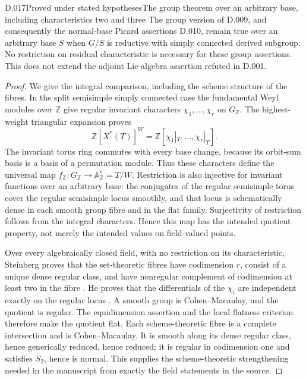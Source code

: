 \begin{saresult}{D.017}{Proved under stated hypotheses}{The group theorem over an arbitrary base, including characteristics two and three}
The group version of D.009, and consequently the normal-base
Picard assertions D.010, remain true over an arbitrary base $S$
when $G/S$ is reductive with simply connected derived subgroup.
No restriction on residual characteristic is necessary for these
group assertions.  This does not extend the adjoint Lie-algebra
assertion refuted in D.001.
\end{saresult}
\begin{proof}
We give the integral comparison, including the scheme structure
of the fibres.  In the split semisimple simply connected case the
fundamental Weyl modules over $\mathbb Z$ give regular invariant
characters $\chi_1,\ldots,\chi_r$ on $G_{\mathbb Z}$.  The
highest-weight triangular expansion proves
\[
 \mathbb Z[X^*(T)]^W=\mathbb Z[\chi_1|_T,\ldots,\chi_r|_T].
\]
The invariant torus ring commutes with every base change, because
its orbit-sum basis is a basis of a permutation module.  Thus these
characters define the universal map
$f_{\mathbb Z}:G_{\mathbb Z}\to\mathbb A^r_{\mathbb Z}=T/W$.
Restriction is also injective for invariant functions over an
arbitrary base: the conjugates of the regular semisimple torus
cover the regular semisimple locus smoothly, and that locus is
schematically dense in each smooth group fibre and in the flat
family.  Surjectivity of restriction follows from the integral
characters.  Hence this map has the intended quotient property,
not merely the intended values on field-valued points.

Over every algebraically closed field, with no restriction on its
characteristic, Steinberg proves that the set-theoretic fibres
have codimension $r$, consist of a unique dense regular class,
and have nonregular complement of codimension at least two in
the fibre \cite[Theorem 6.11, p.64]{D-Steinberg1965}.  He proves
that the differentials of the $\chi_i$ are independent exactly
on the regular locus \cite[Theorem 1.5, p.50; Theorem 8.1,
pp.70--71]{D-Steinberg1965}.  A smooth group is Cohen--Macaulay,
and the quotient is regular.  The equidimension assertion and
the local flatness criterion therefore make the quotient flat.
Each scheme-theoretic fibre is a complete intersection and is
Cohen--Macaulay.  It is smooth along its dense regular class,
hence generically reduced, hence reduced; it is regular in
codimension one and satisfies $S_2$, hence is normal.  This
supplies the scheme-theoretic strengthening needed in the
manuscript from exactly the field statements in the source.


\end{proof}

